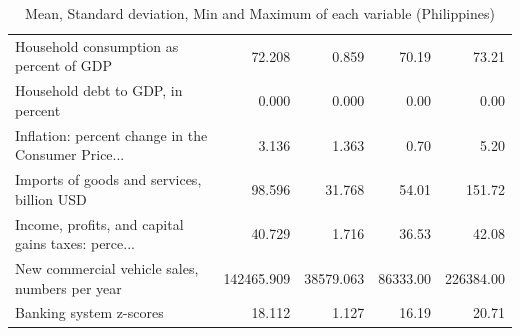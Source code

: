 \documentclass[11pt]{article}
\begin{document}
\begin{table}[H]
{\begin{tabular}{lrrrr}
Household consumption as percent of GDP            &      72.208 &      0.859 &     70.19 &      73.21 \\
Household debt to GDP, in percent                  &       0.000 &      0.000 &      0.00 &       0.00 \\
Inflation: percent change in the Consumer Price... &       3.136 &      1.363 &      0.70 &       5.20 \\
Imports of goods and services, billion USD         &      98.596 &     31.768 &     54.01 &     151.72 \\
Income, profits, and capital gains taxes: perce... &      40.729 &      1.716 &     36.53 &      42.08 \\
New commercial vehicle sales, numbers per year     &  142465.909 &  38579.063 &  86333.00 &  226384.00 \\
Banking system z-scores                            &      18.112 &      1.127 &     16.19 &      20.71 \\
\bottomrule
\end{tabular}}
\caption{Mean, Standard deviation, Min and Maximum of each variable (Philippines)}
\label{tab:describe_phl}
\end{table}
\end{document}
